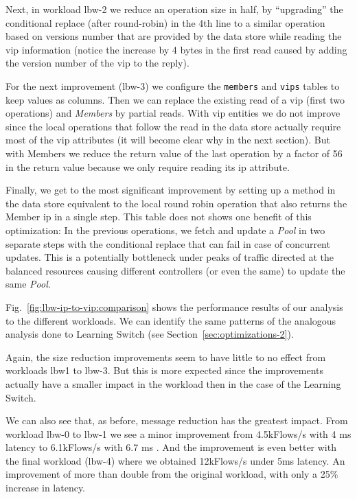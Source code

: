 Next, in workload lbw-2 we reduce an operation size in half, by ``upgrading'' the conditional replace (after round-robin) in the 4th line to a similar operation based on  versions number that are  provided by the data store while reading the \gls{vip} information (notice the increase by 4 bytes in the first read caused by adding the version number of the \gls{vip} to the reply).  

For the next improvement (lbw-3) we configure the \texttt{members} and \texttt{vips} tables to keep values as columns. 
Then we can replace the existing read of a \gls{vip} (first two operations) and \emph{Members} by partial reads. 
With \gls{vip} entities we do not improve since the local operations that follow the read in the
data store actually require most of the \gls{vip} attributes (it will become clear why in the next section). 
But with Members we reduce the return value of the last operation  by a factor of 56 in the return value because we only require reading its \gls{ip} attribute. 

Finally, we get to the most significant improvement by setting up a method in the data store equivalent to the local round robin operation that also returns the Member \gls{ip} in a single step.
This table does not shows one benefit of this optimization: 
In the previous operations, we  fetch and update a \emph{Pool} in two separate steps with the conditional replace that can fail in case of concurrent updates. 
This is a potentially bottleneck under peaks of traffic directed at the balanced resources causing different  controllers (or even the same) to update the same \emph{Pool}. 



Fig.~\ref{fig:lbw-ip-to-vip:comparison} shows the performance results of our analysis to the different workloads. We can identify the same patterns of the analogous analysis done to Learning Switch (see Section~\ref{sec:optimizations-2}). 


Again, the size reduction improvements seem to have little to no effect from workloads lbw1 to lbw-3. 
But this is more expected since the improvements actually have a smaller impact in the workload then in the case of the Learning Switch. 

We can also see that, as before, message reduction has the greatest impact. 
From workload lbw-0 to lbw-1 we see a minor improvement from 4.5kFlows/s with 4 ms latency to 6.1kFlows/s with 6.7 ms .
And the improvement is even better with the final workload (lbw-4) where we obtained 12kFlows/s  under 5ms latency. 
An improvement of more than double from the original workload, with only a 25\% increase in latency. 

